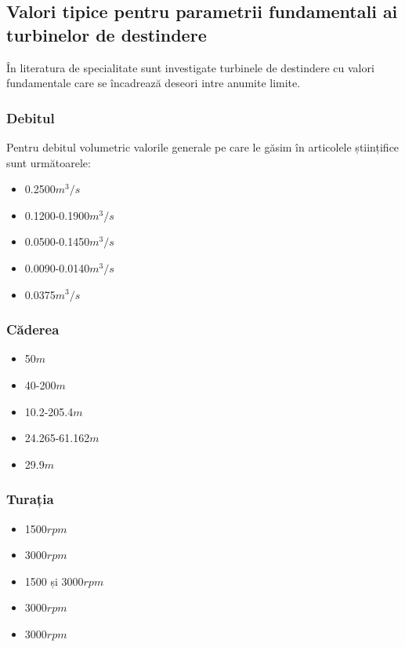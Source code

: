 \subsection{Valori tipice pentru parametrii fundamentali ai turbinelor de destindere}

În literatura de specialitate sunt investigate turbinele de destindere cu valori fundamentale care se încadrează deseori intre anumite limite.


\subsubsection{Debitul}
Pentru debitul volumetric valorile generale pe care le găsim în articolele științifice sunt următoarele:

\begin{itemize}
	\item 0.2500$\si{m^3/s}$ \cite{gentner2000experimentelle}
	\item 0.1200-0.1900$\si{m^3/s}$ \cite{GREES_2014}
	\item 0.0500-0.1450$\si{m^3/s}$ \cite{susanhub}
	\item 0.0090-0.0140$\si{m^3/s}$ \cite{biner2016engineering}
	\item 0.0375$\si{m^3/s}$ \cite{hasmatuchi2014new}
\end{itemize}


\subsubsection{Căderea}

\begin{itemize}
	\item 50$\si{m}$ \cite{gentner2000experimentelle}
	\item 40-200$\si{m}$ \cite{GREES_2014}
	\item 10.2-205.4$\si{m}$ \cite{susanhub}
	\item 24.265-61.162$\si{m}$ \cite{biner2016engineering}
	\item 29.9$\si{m}$ \cite{hasmatuchi2014new}
\end{itemize}


\subsubsection{Turația}

\begin{itemize}
	\item 1500$\si{rpm}$ \cite{gentner2000experimentelle}
	\item 3000$\si{rpm}$ \cite{GREES_2014}
	\item 1500 și 3000$\si{rpm}$ \cite{susanhub}
	\item 3000$\si{rpm}$ \cite{biner2016engineering}
	\item 3000$\si{rpm}$ \cite{hasmatuchi2014new}
\end{itemize}

